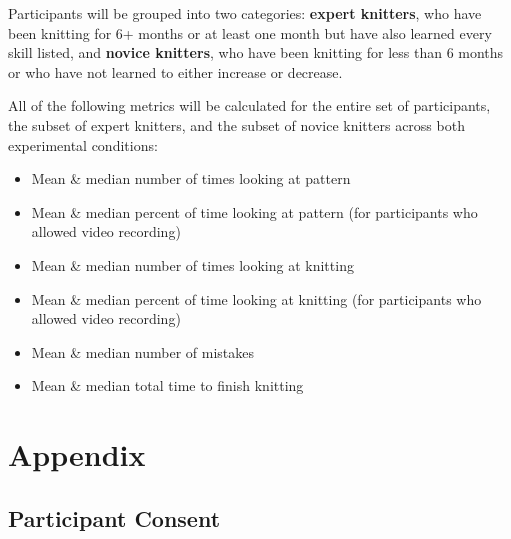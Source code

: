 \documentclass{article}
\begin{document}
Participants will be grouped into two categories:
\textbf{expert knitters}, who have been knitting for 6+ months or at least one month but have also learned every skill listed,
and \textbf{novice knitters}, who have been knitting for less than 6 months or who have not learned to either increase or decrease.

All of the following metrics will be calculated for the entire set of participants, the subset of expert knitters, and the subset of novice knitters across both experimental conditions:
\begin{itemize}
  \item Mean \& median number of times looking at pattern
  \item Mean \& median percent of time looking at pattern (for participants who allowed video recording)
  \item Mean \& median number of times looking at knitting
  \item Mean \& median percent of time looking at knitting (for participants who allowed video recording)
  \item Mean \& median number of mistakes
  \item Mean \& median total time to finish knitting
\end{itemize}

\section{Appendix}

\subsection{Participant Consent} \label{consent}
\end{document}
